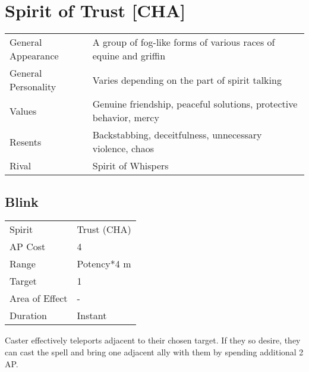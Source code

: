 \documentclass[11pt,a4paper,twocolumn]{book}
\begin{document}
\section*{Spirit of Trust [CHA]}
{
	\begin{tabu} to 75mm{| X[l,4] | X[l,8] |}
		\hline
		General Appearance  & A group of fog-like forms of various races of equine and griffin   \\
		General Personality & Varies depending on the part of spirit talking                     \\
		Values              & Genuine friendship, peaceful solutions, protective behavior, mercy \\
		Resents             & Backstabbing, deceitfulness, unnecessary violence, chaos           \\
		Rival               & Spirit of Whispers                                                 \\ \hline
	\end{tabu}
	
}

\medskip

\subsection*{Blink}

{
	\begin{tabu} to 70mm{| X[l,4] | X[l,7] |}
		\hline
		Spirit         & Trust (CHA)        \\
		AP Cost        & 4                  \\
		Range          & Potency*4 m \\
		Target         & 1                  \\
		Area of Effect & -                  \\
		Duration       & Instant            \\ \hline
	\end{tabu}
	
}
\smallskip

Caster effectively teleports adjacent to their chosen target. If they so desire, they can cast the spell and bring one adjacent ally with them by spending additional 2 AP.
\end{document}
